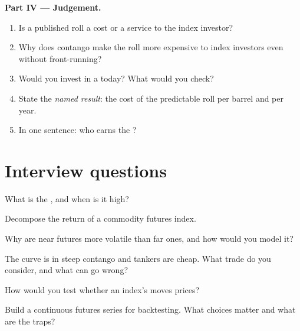 \begin{problem}
\medskip\noindent\textbf{Part IV --- Judgement.}
\begin{enumerate}[resume]
\item Is a published roll a cost or a service to the index investor?
\item Why does contango make the roll more expensive to index investors even without front-running?
\item Would you invest in a  today? What would you check?
\item State the \emph{named result}: the cost of the predictable roll per barrel and per year.
\item In one sentence: who earns the ?
\end{enumerate}
\end{problem}

\section{Interview questions}

\begin{interviewq}\label{iq:m3:forward-curves-storage-and-convenience-yield:1}
What is the , and when is it high?
\end{interviewq}

\begin{interviewq}\label{iq:m3:forward-curves-storage-and-convenience-yield:2}
Decompose the return of a commodity futures index.
\end{interviewq}

\begin{interviewq}\label{iq:m3:forward-curves-storage-and-convenience-yield:3}
Why are near futures more volatile than far ones, and how would you model it?
\end{interviewq}

\begin{interviewq}\label{iq:m3:forward-curves-storage-and-convenience-yield:4}
The curve is in steep contango and tankers are cheap. What trade do you consider, and what can go wrong?
\end{interviewq}

\begin{interviewq}\label{iq:m3:forward-curves-storage-and-convenience-yield:5}
How would you test whether an index's  moves prices?
\end{interviewq}

\begin{interviewq}\label{iq:m3:forward-curves-storage-and-convenience-yield:6}
Build a continuous futures series for backtesting. What choices matter and what are the traps?
\end{interviewq}
